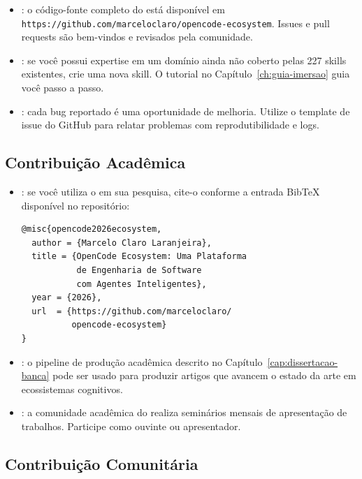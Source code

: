 \begin{itemize}
    \item {}: o código-fonte completo do
    \opencodeeco{} está disponível em
    \texttt{https://github.com/marceloclaro/opencode-ecosystem}.
    Issues e pull requests são bem-vindos e revisados pela
    comunidade.

    \item {}: se você possui expertise em
    um domínio ainda não coberto pelas 227 skills existentes, crie
    uma nova skill. O tutorial no Capítulo~\ref{ch:guia-imersao}
    guia você passo a passo.

    \item {}: cada bug reportado é uma
    oportunidade de melhoria. Utilize o template de issue do
    GitHub para relatar problemas com reprodutibilidade e logs.
\end{itemize}

\subsection{Contribuição Acadêmica}

\begin{itemize}
    \item {}: se você utiliza o \opencodeeco{} em
    sua pesquisa, cite-o conforme a entrada BibTeX disponível no
    repositório:
\begin{verbatim}
@misc{opencode2026ecosystem,
  author = {Marcelo Claro Laranjeira},
  title = {OpenCode Ecosystem: Uma Plataforma
           de Engenharia de Software
           com Agentes Inteligentes},
  year = {2026},
  url  = {https://github.com/marceloclaro/
          opencode-ecosystem}
}
\end{verbatim}

    \item {}: o pipeline de produção
    acadêmica descrito no Capítulo~\ref{cap:dissertacao-banca}
    pode ser usado para produzir artigos \qualisA{} que avancem o
    estado da arte em ecossistemas cognitivos.

    \item {}: a comunidade acadêmica do
    \opencodeeco{} realiza seminários mensais de apresentação de
    trabalhos. Participe como ouvinte ou apresentador.
\end{itemize}

\subsection{Contribuição Comunitária}

